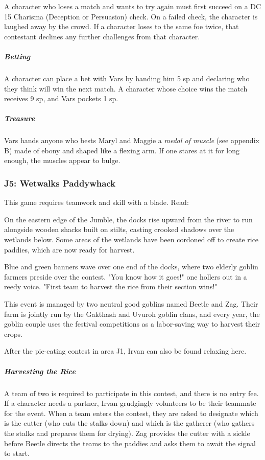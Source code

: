 \documentclass[10pt,a4paper,twoside,bg=print,twocolumn,openany,nodeprecatedcode]{dndbook}
\begin{document}
A character who loses a match and wants to try again must first succeed on a DC 15 Charisma (Deception or Persuasion) check. On a failed check, the character is laughed away by the crowd. If a character loses to the same foe twice, that contestant declines any further challenges from that character.

\subparagraph{Betting}
A character can place a bet with Vars by handing him 5 sp and declaring who they think will win the next match. A character whose choice wins the match receives 9 sp, and Vars pockets 1 sp.

\subparagraph{Treasure}
Vars hands anyone who bests Maryl and Maggie a \textit{medal of muscle} (see appendix B) made of ebony and shaped like a flexing arm. If one stares at it for long enough, the muscles appear to bulge.

\subsubsection{J5: Wetwalks Paddywhack}
This game requires teamwork and skill with a blade. Read:

\begin{DndReadAloud}{}
On the eastern edge of the Jumble, the docks rise upward from the river to run alongside wooden shacks built on stilts, casting crooked shadows over the wetlands below. Some areas of the wetlands have been cordoned off to create rice paddies, which are now ready for harvest.

Blue and green banners wave over one end of the docks, where two elderly goblin farmers preside over the contest. "You know how it goes!" one hollers out in a reedy voice. "First team to harvest the rice from their section wins!"

\end{DndReadAloud}

This event is managed by two neutral good goblins named Beetle and Zag. Their farm is jointly run by the Gakthash and Uvuroh goblin clans, and every year, the goblin couple uses the festival competitions as a labor-saving way to harvest their crops.

After the pie-eating contest in area J1, Irvan can also be found relaxing here.

\subparagraph{Harvesting the Rice}
A team of two is required to participate in this contest, and there is no entry fee. If a character needs a partner, Irvan grudgingly volunteers to be their teammate for the event. When a team enters the contest, they are asked to designate which is the cutter (who cuts the stalks down) and which is the gatherer (who gathers the stalks and prepares them for drying). Zag provides the cutter with a sickle before Beetle directs the teams to the paddies and asks them to await the signal to start.
\end{document}
